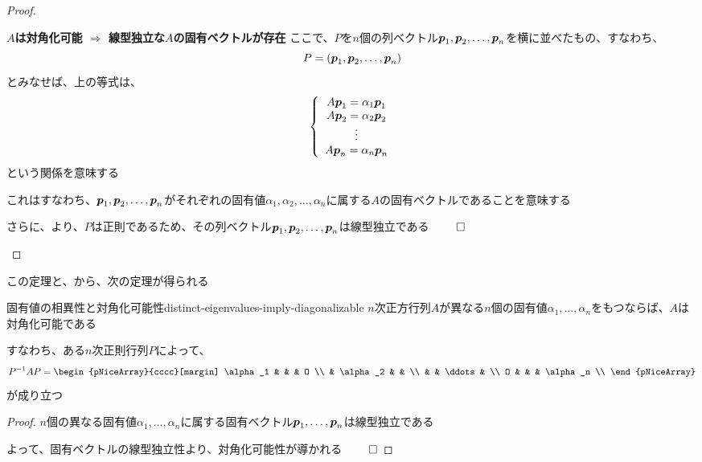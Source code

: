 \documentclass[../../../topic_linear-algebra]{subfiles}
\begin{document}
\begin{proof}
\begin{subpattern}{\bfseries $A$は対角化可能 $\Longrightarrow$ 線型独立な$A$の固有ベクトルが存在}
    ここで、$P$を$n$個の列ベクトル$\vb*{p}_1, \vb*{p}_2, \ldots, \vb*{p}_n$を横に並べたもの、すなわち、
    \begin{equation*}
      P = (\vb*{p}_1, \vb*{p}_2, \ldots, \vb*{p}_n)
    \end{equation*}
    とみなせば、上の等式は、
    \begin{equation*}
      \left\{
      \begin{array}{c}
        A\vb*{p}_1 = \alpha_1 \vb*{p}_1 \\
        A\vb*{p}_2 = \alpha_2 \vb*{p}_2 \\
        \vdots                          \\
        A\vb*{p}_n = \alpha_n \vb*{p}_n
      \end{array}
      \right.
    \end{equation*}
    という関係を意味する

    これはすなわち、$\vb*{p}_1, \vb*{p}_2, \ldots, \vb*{p}_n$がそれぞれの固有値$\alpha_1, \alpha_2, \ldots, \alpha_n$に属する$A$の固有ベクトルであることを意味する

    さらに、より、$P$は正則であるため、その列ベクトル$\vb*{p}_1, \vb*{p}_2, \ldots, \vb*{p}_n$は線型独立である $\qed$
  \end{subpattern}
\end{proof}

この定理と、から、次の定理が得られる

\begin{theorem}{固有値の相異性と対角化可能性}{distinct-eigenvalues-imply-diagonalizable}
  $n$次正方行列$A$が異なる$n$個の固有値$\alpha_1, \ldots, \alpha_n$をもつならば、$A$は対角化可能である

  すなわち、ある$n$次正則行列$P$によって、
  \begin{equation*}
    P^{-1}AP = \begin{pNiceArray}{cccc}[margin]
      \alpha_1 & & & O \\
      & \alpha_2 & & \\
      & & \ddots & \\
      O & & & \alpha_n \\
    \end{pNiceArray}
  \end{equation*}
  が成り立つ
\end{theorem}

\begin{proof}
  $n$個の異なる固有値$\alpha_1, \ldots, \alpha_n$に属する固有ベクトル$\vb*{p}_1, \ldots, \vb*{p}_n$は線型独立である

  よって、固有ベクトルの線型独立性より、対角化可能性が導かれる $\qed$
\end{proof}
\end{document}
